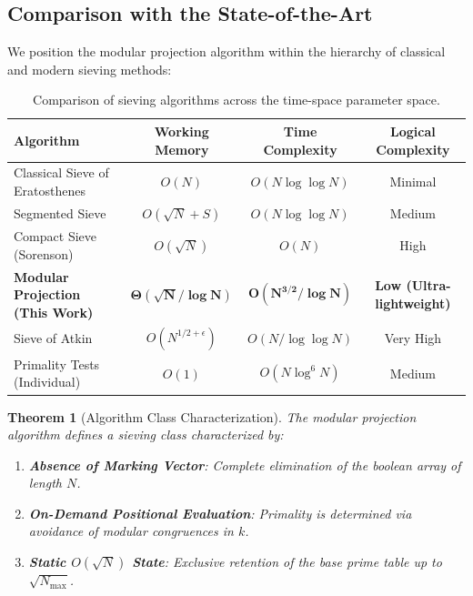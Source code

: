 \documentclass{article}
\numberwithin{equation}{section}
\theoremstyle{plain}
\newtheorem{theorem}{Theorem}[section]
\theoremstyle{definition}
\begin{document}
\subsection{Comparison with the State-of-the-Art}

We position the modular projection algorithm within the hierarchy of classical and modern sieving methods:

\begin{table}[htbp]
\centering
\small
\setlength{\tabcolsep}{3.5pt}
\caption{Comparison of sieving algorithms across the time-space parameter space.}
\label{tab:espectro-algoritmos}
\begin{tabular}{lccc}
\toprule
\textbf{Algorithm} & \textbf{Working Memory} & \textbf{Time Complexity} & \textbf{Logical Complexity} \\
\midrule
Classical Sieve of Eratosthenes & $O(N)$ & $O(N \log \log N)$ & Minimal \\
Segmented Sieve & $O(\sqrt{N} + S)$ & $O(N \log \log N)$ & Medium \\
Compact Sieve (Sorenson) & $O(\sqrt{N})$ & $O(N)$ & High \\
\textbf{Modular Projection (This Work)} & $\mathbf{\Theta(\sqrt{N}/\log N)}$ & $\mathbf{O(N^{3/2}/\log N)}$ & \textbf{Low (Ultra-lightweight)} \\
Sieve of Atkin & $O(N^{1/2+\epsilon})$ & $O(N/\log \log N)$ & Very High \\
Primality Tests (Individual) & $O(1)$ & $O(N \log^6 N)$ & Medium \\
\bottomrule
\end{tabular}
\end{table}

\begin{theorem}[Algorithm Class Characterization]
\label{thm:clase-algoritmos}
The modular projection algorithm defines a sieving class characterized by:
\begin{enumerate}
    \item \textbf{Absence of Marking Vector}: Complete elimination of the boolean array of length $N$.
    \item \textbf{On-Demand Positional Evaluation}: Primality is determined via avoidance of modular congruences in $k$.
    \item \textbf{Static $O(\sqrt{N})$ State}: Exclusive retention of the base prime table up to $\sqrt{N_{\max}}$.
\end{enumerate}
\end{theorem}
\end{document}
